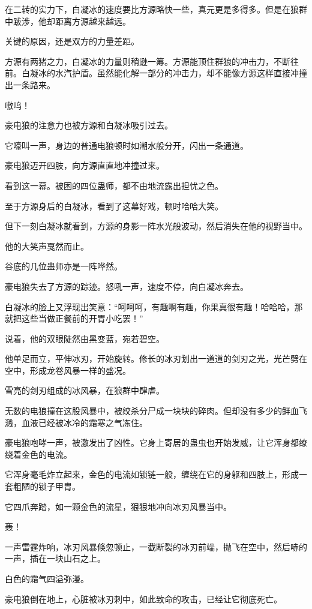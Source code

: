 \begin{this_body}
在二转的实力下，白凝冰的速度要比方源略快一些，真元更是多得多。但是在狼群中跋涉，他却距离方源越来越远。

关键的原因，还是双方的力量差距。

方源有两猪之力，白凝冰的力量则稍逊一筹。方源能顶住群狼的冲击力，不断往前。白凝冰的水汽护盾。虽然能化解一部分的冲击力，却不能像方源这样直接冲撞出一条路来。

嗷呜！

豪电狼的注意力也被方源和白凝冰吸引过去。

它嚎叫一声，身边的普通电狼顿时如潮水般分开，闪出一条通道。

豪电狼迈开四肢，向方源直直地冲撞过来。

看到这一幕。被困的四位蛊师，都不由地流露出担忧之色。

至于方源身后的白凝冰，看到了这幕好戏，顿时哈哈大笑。

但下一刻白凝冰就看到，方源的身影一阵水光般波动，然后消失在他的视野当中。

他的大笑声戛然而止。

谷底的几位蛊师亦是一阵哗然。

豪电狼失去了方源的踪迹。怒吼一声，速度不停，向白凝冰奔去。

白凝冰的脸上又浮现出笑意：“呵呵呵，有趣啊有趣，你果真很有趣！哈哈哈，那就把这些当做正餐前的开胃小吃罢！”

说着，他的双眼陡然由黑变蓝，宛若碧空。

他单足而立，平伸冰刃，开始旋转。修长的冰刃划出一道道的剑刃之光，光芒劈在空中，形成龙卷风暴一样的盛况。

雪亮的剑刃组成的冰风暴，在狼群中肆虐。

无数的电狼撞在这股风暴中，被绞杀分尸成一块块的碎肉。但却没有多少的鲜血飞溅，血液已经被冰冷的霜寒之气冻住。

豪电狼咆哮一声，被激发出了凶性。它身上寄居的蛊虫也开始发威，让它浑身都缭绕着金色的电流。

它浑身毫毛炸立起来，金色的电流如锁链一般，缠绕在它的身躯和四肢上，形成一套粗陋的锁子甲胄。

它四爪奔踏，如一颗金色的流星，狠狠地冲向冰刃风暴当中。

轰！

一声雷霆炸响，冰刃风暴倏忽顿止，一截断裂的冰刃前端，抛飞在空中，然后哧的一声，插在一块山石之上。

白色的霜气四溢弥漫。

豪电狼倒在地上，心脏被冰刃刺中，如此致命的攻击，已经让它彻底死亡。


\end{this_body}
